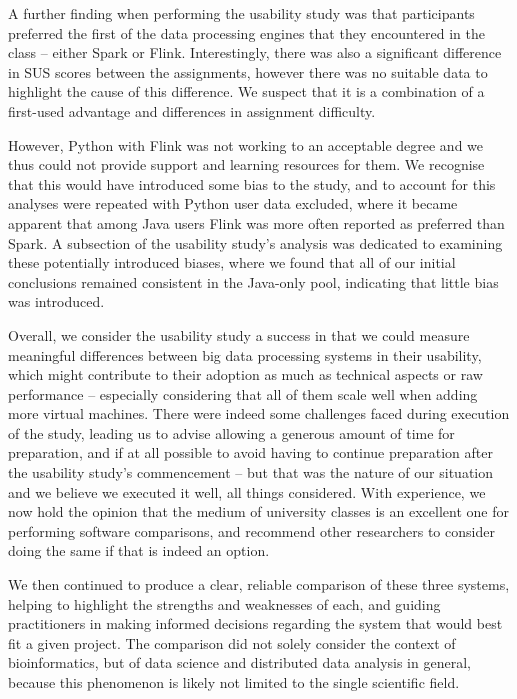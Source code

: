   A further finding when performing the usability study was that participants preferred the first of the data processing engines that they encountered in the class -- either Spark or Flink. Interestingly, there was also a significant difference in SUS scores between the assignments, however there was no suitable data to highlight the cause of this difference. We suspect that it is a combination of a first-used advantage and differences in assignment difficulty.
  
  However, Python with Flink was not working to an acceptable degree and we thus could not provide support and learning resources for them. We recognise that this would have introduced some bias to the study, and to account for this analyses were repeated with Python user data excluded, where it became apparent that among Java users Flink was more often reported as preferred than Spark. A subsection of the usability study's analysis was dedicated to examining these potentially introduced biases, where we found that all of our initial conclusions remained consistent in the Java-only pool, indicating that little bias was introduced.
  
  Overall, we consider the usability study a success in that we could measure meaningful differences between big data processing systems in their usability, which might contribute to their adoption as much as technical aspects or raw performance -- especially considering that all of them scale well when adding more virtual machines. There were indeed some challenges faced during execution of the study, leading us to advise allowing a generous amount of time for preparation, and if at all possible to avoid having to continue preparation after the usability study's commencement -- but that was the nature of our situation and we believe we executed it well, all things considered. With experience, we now hold the opinion that the medium of university classes is an excellent one for performing software comparisons, and recommend other researchers to consider doing the same if that is indeed an option. \medskip
  
  
  We then continued to produce a clear, reliable comparison of these three systems, helping to highlight the strengths and weaknesses of each, and guiding practitioners in making informed decisions regarding the system that would best fit a given project. The comparison did not solely consider the context of bioinformatics, but of data science and distributed data analysis in general, because this phenomenon is likely not limited to the single scientific field.

